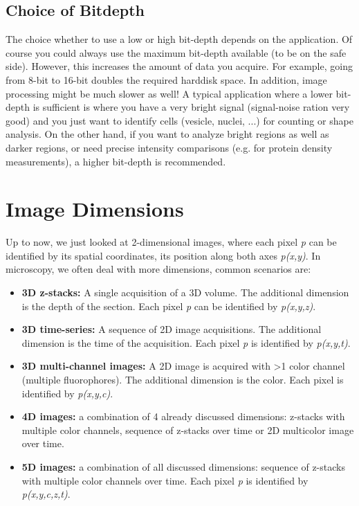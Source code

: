 \subsection{Choice of Bitdepth}
\label{sec:bitdepth-choice}

The choice whether to use a low or high bit-depth depends on the application. Of course you could always use the maximum bit-depth available (to be on the safe side). However, this increases the amount of data you acquire. For example, going from 8-bit to 16-bit doubles the required harddisk space. In addition, image processing might be much slower as well! A typical application where a lower bit-depth is sufficient is where you have a very bright signal (signal-noise ration very good) and you just want to identify cells (vesicle, nuclei, ...) for counting or shape analysis. On the other hand, if you want to analyze bright regions as well as darker regions, or need precise intensity comparisons (e.g. for protein density measurements), a higher bit-depth is recommended.

\section{Image Dimensions}

Up to now, we just looked at 2-dimensional images, where each pixel \emph{p} can be identified by its spatial coordinates, its position along both axes \emph{p(x,y)}. In microscopy, we often deal with more dimensions, common scenarios are:

\begin{itemize}
	\item \textbf{3D z-stacks:} A single acquisition of a 3D volume. The additional dimension is the depth of the section. Each pixel \emph{p} can be identified by \emph{p(x,y,z)}.
	\item \textbf{3D time-series:} A sequence of 2D image acquisitions. The additional dimension is the time of the acquisition. Each pixel \emph{p} is identified by \emph{p(x,y,t)}. 
	\item \textbf{3D multi-channel images:} A 2D image is acquired with >1 color channel (multiple fluorophores). The additional dimension is the color. Each pixel is identified by \emph{p(x,y,c)}.
	\item \textbf{4D images:} a combination of 4 already discussed dimensions: z-stacks with multiple color channels, sequence of z-stacks over time or 2D multicolor image over time.
	\item \textbf{5D images:} a combination of all discussed dimensions: sequence of z-stacks with multiple color channels over time. Each pixel \emph{p} is identified by \emph{p(x,y,c,z,t)}.
\end{itemize}

